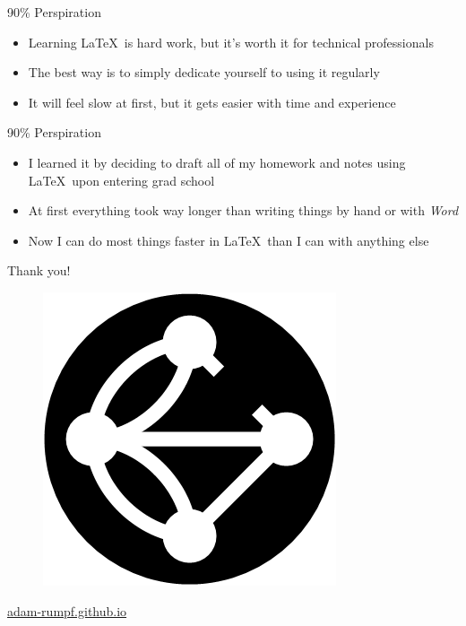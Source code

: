 \documentclass{beamer} %
\begin{document}
\begin{frame}{90\% Perspiration}

\begin{itemize}
	\item Learning \LaTeX\ is hard work, but it's worth it for technical professionals
	\item The best way is to simply dedicate yourself to using it regularly
	\item It will feel slow at first, but it gets easier with time and experience
\end{itemize}

\end{frame}

\begin{frame}{90\% Perspiration}

\begin{itemize}
	\item I learned it by deciding to draft all of my homework and notes using \LaTeX\ upon entering grad school
	\item At first everything took way longer than writing things by hand or with \textit{Word}
	\item Now I can do most things faster in \LaTeX\ than I can with anything else
\end{itemize}

\end{frame}

\begin{frame}{Thank you!}

\centering

\begin{figure}
	\includegraphics[height=0.3\textheight]{figures/broken_konigsberg_circle.png}
\end{figure}

\url{adam-rumpf.github.io}

\end{frame}
\end{document}
